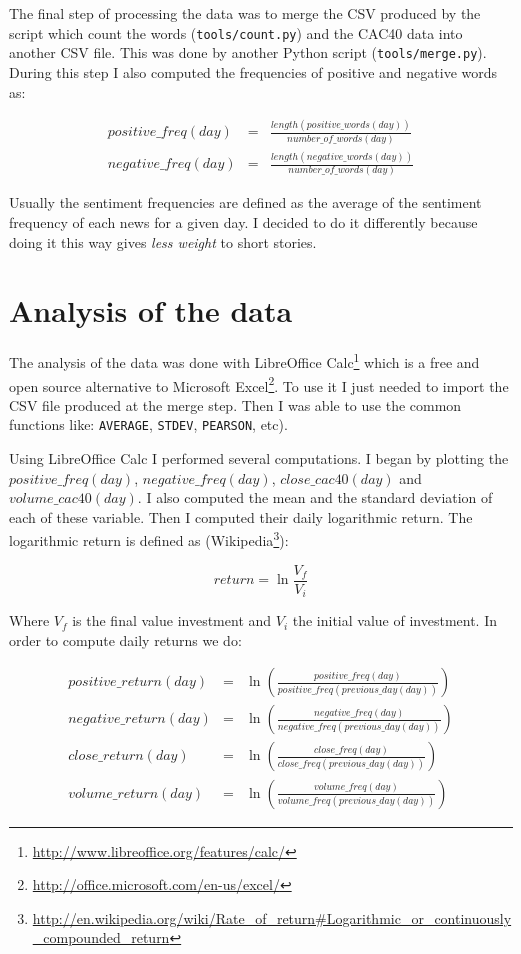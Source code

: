 \documentclass[12pt]{report}
\begin{document}
    		The final step of processing the data was to merge the CSV produced by the script which count the words (\lstinline!tools/count.py!) and the CAC40 data into another CSV file. This was done by another Python script (\lstinline!tools/merge.py!). During this step I also computed the frequencies of positive and negative words as:
			
			\begin{eqnarray*}
				positive\_freq(day) &=& \frac{length(positive\_words(day))}{number\_of\_words(day)}\\
				negative\_freq(day) &=& \frac{length(negative\_words(day))}{number\_of\_words(day)}
			\end{eqnarray*}
			
			Usually the sentiment frequencies are defined as the average of the sentiment frequency of each news for a given day. I decided to do it differently because doing it this way gives \emph{less weight} to short stories.
			
		\section{Analysis of the data}
			
			The analysis of the data was done with LibreOffice Calc\footnote{\url{http://www.libreoffice.org/features/calc/}} which is a free and open source alternative to Microsoft Excel\footnote{\url{http://office.microsoft.com/en-us/excel/}}. To use it I just needed to import the  CSV file produced at the merge step. Then I was able to use the common functions like: \lstinline!AVERAGE!, \lstinline!STDEV!, \lstinline!PEARSON!, etc).
			
			Using LibreOffice Calc I performed several computations. I began by plotting the $positive\_freq(day)$, $negative\_freq(day)$, $close\_cac40(day)$ and $volume\_cac40(day)$. I also computed the mean and the standard deviation of each of these variable. Then I computed their daily logarithmic return. The logarithmic return is defined as  (Wikipedia\footnote{\url{http://en.wikipedia.org/wiki/Rate_of_return\#Logarithmic_or_continuously_compounded_return}}):
			
			$$return = \ln\frac{V_f}{V_i}$$
			
			Where $V_f$ is the final value investment and $V_i$ the initial value of investment. In order to compute daily returns we do:
			
			\begin{eqnarray*}
				positive\_return(day) &=& \ln\left(\frac{positive\_freq(day)}{positive\_freq(previous\_day(day))}\right)\\
				negative\_return(day) &=& \ln\left(\frac{negative\_freq(day)}{negative\_freq(previous\_day(day))}\right)\\
				close\_return(day) &=& \ln\left(\frac{close\_freq(day)}{close\_freq(previous\_day(day))}\right)\\
				volume\_return(day) &=& \ln\left(\frac{volume\_freq(day)}{volume\_freq(previous\_day(day))}\right)
			\end{eqnarray*}
			
\end{document}
